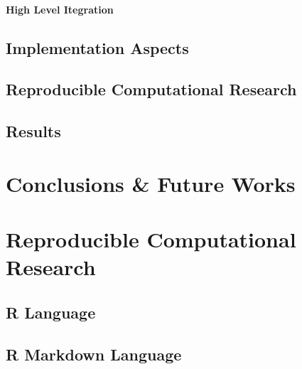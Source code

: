 \documentclass[b5paper,oneside,british,intoc,bibliograph=totoc,index=totoc,BCOR10mm,twoside,openright]{book}
\numberwithin{equation}{section}
\numberwithin{figure}{section}
\begin{document}
\subsubsection{High Level Itegration}
\section{Implementation Aspects}
\section{Reproducible Computational Research}
\section{Results}
\chapter{Conclusions \& Future Works}

\chapter{Reproducible Computational Research}

\begin{appendices}
\section{R Language}
\section{R Markdown Language}
%
%
%
\end{appendices}

%
%
%
%
%
%

%
%
%


\printbibliography[heading=bibnumbered]
\cleardoublepage

\printglossaries

\cleardoublepage
{}
\listoffigures

\cleardoublepage
{}
\listoftables

\end{document}
